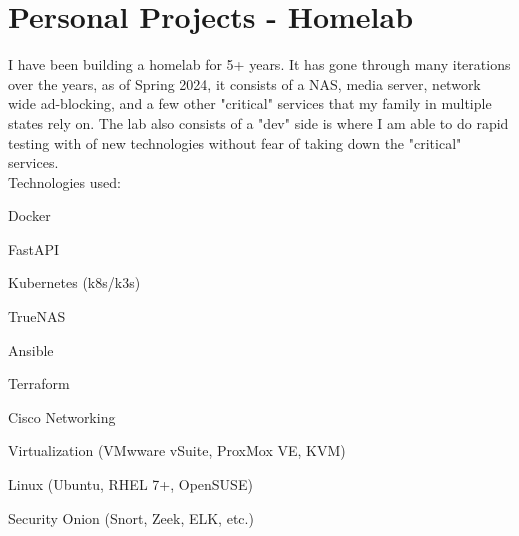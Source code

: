 \documentclass[a4paper,10pt]{article}
\begin{document}
\section*{Personal Projects - Homelab}
I have been building a homelab for 5+ years. It has gone through many iterations over the years, as of Spring 2024, it consists of a NAS, media server, network wide ad-blocking, and a few other "critical" services that my family in multiple states rely on. The lab also consists of a "dev" side is where I am able to do rapid testing with of new technologies without fear of taking down the "critical" services. 
\\
Technologies used:
\begin{itemize}
    \small
    \begin{multicols}{2}
    \item Docker
    \item FastAPI
    \item Kubernetes (k8s/k3s)
    \item TrueNAS
    \item Ansible
    \item Terraform
    \item Cisco Networking
    \item Virtualization (VMwware vSuite, ProxMox VE, KVM)
    \item Linux (Ubuntu, RHEL 7+, OpenSUSE)
    \item Security Onion (Snort, Zeek, ELK, etc.)
    \end{multicols}
\end{itemize}
\end{document}
